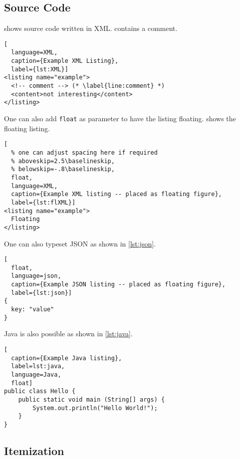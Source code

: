 \documentclass[runningheads,a4paper,english]{llncs}[2022/01/12]
\begin{document}
\subsection{Source Code}

\begin{ltgexample}
 shows source code written in XML.
 contains a comment.

\begin{lstlisting}[
  language=XML,
  caption={Example XML Listing},
  label={lst:XML}]
<listing name="example">
  <!-- comment --> (* \label{line:comment} *)
  <content>not interesting</content>
</listing>
\end{lstlisting}
\end{ltgexample}

One can also add \verb+float+ as parameter to have the listing floating.
 shows the floating listing.

\begin{ltgexample}
\begin{lstlisting}[
  % one can adjust spacing here if required
  % aboveskip=2.5\baselineskip,
  % belowskip=-.8\baselineskip,
  float,
  language=XML,
  caption={Example XML listing -- placed as floating figure},
  label={lst:flXML}]
<listing name="example">
  Floating
</listing>
\end{lstlisting}
\end{ltgexample}

One can also typeset JSON as shown in \cref{lst:json}.

\begin{ltgexample}
\begin{lstlisting}[
  float,
  language=json,
  caption={Example JSON listing -- placed as floating figure},
  label={lst:json}]
{
  key: "value"
}
\end{lstlisting}
\end{ltgexample}

Java is also possible as shown in \cref{lst:java}.

\begin{ltgexample}
\begin{lstlisting}[
  caption={Example Java listing},
  label=lst:java,
  language=Java,
  float]
public class Hello {
    public static void main (String[] args) {
        System.out.println("Hello World!");
    }
}
\end{lstlisting}
\end{ltgexample}

\subsection{Itemization}
\end{document}
